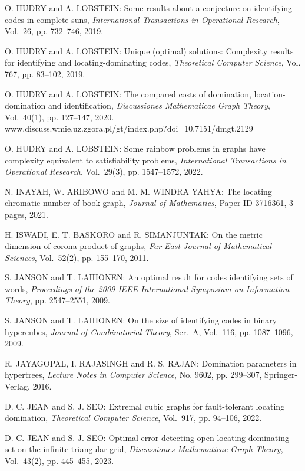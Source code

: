 \begin{thebibliography}{999}
O. HUDRY and A. LOBSTEIN: Some results about a conjecture on identifying codes in complete suns, {\it International Transactions in Operational Research}, Vol.~26, pp. 732--746, 2019.

O. HUDRY and A. LOBSTEIN: Unique (optimal) solutions: Complexity results for identifying and locating-dominating codes, {\it Theoretical Computer Science}, Vol. 767, pp. 83--102, 2019.

O. HUDRY and A. LOBSTEIN: The compared costs of domination, location-domination and identification, {\it Discussiones Mathematicae Graph Theory}, Vol.~40(1), pp. 127--147, 2020.\\
www.discuss.wmie.uz.zgora.pl/gt/index.php?doi=10.7151/dmgt.2129

O. HUDRY and A. LOBSTEIN: Some rainbow problems in graphs have complexity equivalent to satisfiability problems, {\it International Transactions in Operational Research}, Vol.~29(3), pp. 1547--1572, 2022.

N. INAYAH, W. ARIBOWO and M. M. WINDRA YAHYA: The locating chromatic number of book graph, {\it Journal of Mathematics}, Paper ID 3716361, 3 pages, 2021.

H. ISWADI, E. T. BASKORO and R. SIMANJUNTAK: On the metric dimension of corona product of graphs, {\it Far East Journal of Mathematical Sciences}, Vol.~52(2), pp. 155--170, 2011.

S. JANSON and T. LAIHONEN: An optimal result for codes identifying sets of words, {\it Proceedings of the 2009 IEEE International Symposium on Information Theory}, pp. 2547--2551, 2009.

S. JANSON and T. LAIHONEN: On the size of identifying codes in binary hypercubes, {\it Journal of Combinatorial Theory}, Ser.~A, Vol.~116, pp. 1087--1096, 2009.

R. JAYAGOPAL, I. RAJASINGH and R. S. RAJAN: Domination parameters in hypertrees, {\it Lecture Notes in Computer Science}, No. 9602, pp. 299--307, Springer-Verlag, 2016.

D. C. JEAN and S. J. SEO: Extremal cubic graphs for fault-tolerant locating domination, {\it Theoretical Computer Science}, Vol.~917, pp. 94--106, 2022.

D. C. JEAN and S. J. SEO: Optimal error-detecting open-locating-dominating set on the infinite triangular grid, {\it Discussiones Mathematicae Graph Theory}, Vol.~43(2), pp. 445--455, 2023.


\end{thebibliography}
